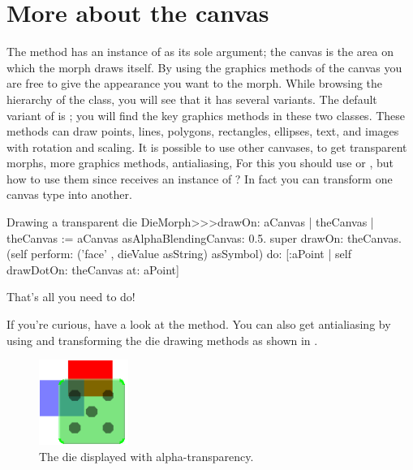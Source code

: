 \documentclass[a4paper,10pt,twoside]{book}
\begin{document}


\section{More about the canvas}

The  method has an instance of  as its sole argument;
the canvas is the area on which the morph draws itself.
By using the graphics methods of the canvas you are free to give the appearance you want to the morph.
While browsing the hierarchy of the  class, you will see that it has several variants.
The default variant of  is ; you will find the key graphics methods in these two classes.
These methods can draw points, lines, polygons, rectangles, ellipses, text, and images with rotation and scaling.
It is possible to use other canvases, to get transparent morphs, more graphics methods, antialiasing, \etc
For this you should use  or , but how to use them since  receives an instance of ?
In fact you can transform one canvas type into another.

\begin{method}{Drawing a transparent die}
DieMorph>>>drawOn: aCanvas
   | theCanvas |
   theCanvas := aCanvas asAlphaBlendingCanvas: 0.5.
   super drawOn: theCanvas.
   (self perform: ('face' , dieValue asString) asSymbol)
      do: [:aPoint | self drawDotOn: theCanvas at: aPoint]
\end{method}
\noindent
That's all you need to do!

If you're curious, have a look at the  method.
You can also get antialiasing by using  and transforming the die drawing methods as shown in .

\begin{figure}[ht]
	\centerline{\includegraphics{multiMorphs}}
	\caption{The die displayed with alpha-transparency.
		\label{fig:multiMorphs}}
\end{figure}
\end{document}
